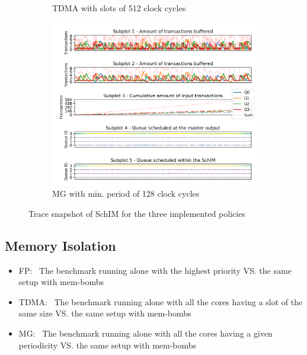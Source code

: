 \begin{figure}
\begin{subfigure}{.31\textwidth}
        \caption{TDMA with slots of 512 clock cycles}
        \label{fig:schim_behaviour_tdma}
      \end{subfigure}
      \hfill
      \begin{subfigure}{.31\textwidth}
        \centering
        \includegraphics[scale=0.31]{images/iladata_mg_3_128_128_3.png}
        \caption{MG with min. period of 128 clock cycles}
        \label{fig:schim_behaviour_mg}
      \end{subfigure}
      \caption{Trace snapshot of SchIM for the three implemented policies}
      \label{fig:schim_behaviour}
    \end{figure}

  \subsection{Memory Isolation}
    \begin{itemize}
      \item FP:~ The benchmark running alone with the highest priority VS. the same setup with mem-bombs
      \item TDMA:~ The benchmark running alone with all the cores having a slot of the same size VS. the same setup with mem-bombs
      \item MG:~ The benchmark running alone with all the cores having a given periodicity VS. the same setup with mem-bombs
    \end{itemize}
